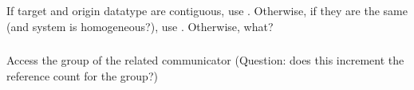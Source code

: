 \documentclass{article}
\begin{document}
\subsubsection{}
\subsubsection{}
\begin{adi3}
\begin{mmadi}If target and origin datatype are contiguous, use
  .  Otherwise, if they are the same (and system is
  homogeneous?), use .  
  Otherwise, what?
\end{mmadi}
\end{adi3}

\subsubsection{}

\subsubsection{}

\subsubsection{}
\subsubsection{}

\subsubsection{}
\subsubsection{}

\subsubsection{}
Access the group of the related communicator (Question: does this increment the
reference count for the group?)

\subsubsection{}
\end{document}
